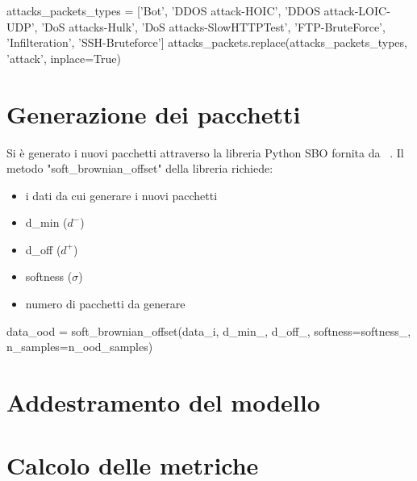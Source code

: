 \begin{python}
attacks_packets_types = ['Bot', 'DDOS attack-HOIC', 'DDOS attack-LOIC-UDP',
                            'DoS attacks-Hulk', 'DoS attacks-SlowHTTPTest', 'FTP-BruteForce',
                            'Infilteration', 'SSH-Bruteforce']
attacks_packets.replace(attacks_packets_types, 'attack', inplace=True)
\end{python}


\section{Generazione dei pacchetti}

Si è generato i nuovi pacchetti attraverso la libreria Python SBO fornita da ~\cite{sbo}. Il metodo "soft\_brownian\_offset" della libreria richiede:

\begin{itemize}
    \item i dati da cui generare i nuovi pacchetti
    \item d\_min ($d^{-}$)
    \item d\_off ($d^{+}$)
    \item softness ($\sigma$)
    \item numero di pacchetti da generare
\end{itemize}

\begin{python}
    data_ood = soft_brownian_offset(data_i, d_min_, d_off_,
                                        softness=softness_,
                                        n_samples=n_ood_samples)
\end{python}



\section{Addestramento del modello}

\section{Calcolo delle metriche}


